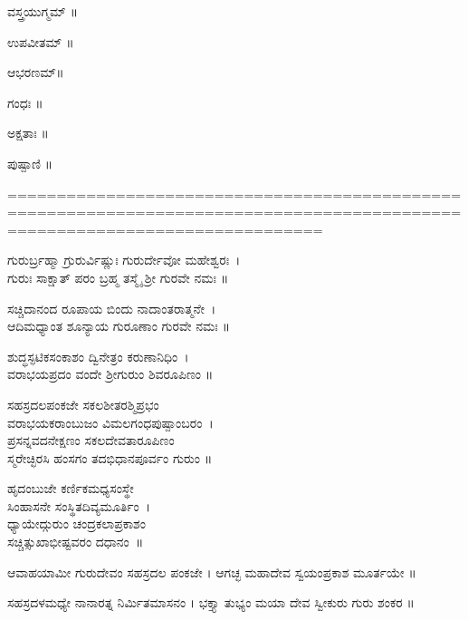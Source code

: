 ವಸ್ತ್ರಯುಗ್ಮಮ್ ॥

 ಉಪವೀತಮ್ ॥

ಆಭರಣಮ್॥

ಗಂಧಃ ॥

ಅಕ್ಷತಾಃ ॥

ಪುಷ್ಪಾಣಿ ॥


============================================================================================================================




ಗುರುರ್ಬ್ರಹ್ಮಾ ಗ್ರುರುರ್ವಿಷ್ಣುಃ ಗುರುರ್ದೇವೋ ಮಹೇಶ್ವರಃ~।\\
ಗುರುಃ ಸಾಕ್ಷಾತ್ ಪರಂ ಬ್ರಹ್ಮ ತಸ್ಮೈ ಶ್ರೀ ಗುರವೇ ನಮಃ ॥

ಸಚ್ಚಿದಾನಂದ ರೂಪಾಯ ಬಿಂದು ನಾದಾಂತರಾತ್ಮನೇ~।\\
ಆದಿಮಧ್ಯಾಂತ ಶೂನ್ಯಾಯ ಗುರೂಣಾಂ ಗುರವೇ ನಮಃ ॥

ಶುದ್ಧಸ್ಫಟಿಕಸಂಕಾಶಂ ದ್ವಿನೇತ್ರಂ ಕರುಣಾನಿಧಿಂ~।\\
ವರಾಭಯಪ್ರದಂ ವಂದೇ ಶ್ರೀಗುರುಂ ಶಿವರೂಪಿಣಂ ॥

ಸಹಸ್ರದಲಪಂಕಜೇ ಸಕಲಶೀತರಶ್ಮಿಪ್ರಭಂ\\
ವರಾಭಯಕರಾಂಬುಜಂ ವಿಮಲಗಂಧಪುಷ್ಪಾಂಬರಂ~।\\
ಪ್ರಸನ್ನವದನೇಕ್ಷಣಂ ಸಕಲದೇವತಾರೂಪಿಣಂ\\
ಸ್ಮರೇಚ್ಛಿರಸಿ ಹಂಸಗಂ ತದಭಿಧಾನಪೂರ್ವಂ ಗುರುಂ ॥


ಹೃದಂಬುಜೇ ಕರ್ಣಿಕಮಧ್ಯಸಂಸ್ಥೇ\\ ಸಿಂಹಾಸನೇ ಸಂಸ್ಥಿತದಿವ್ಯಮೂರ್ತಿಂ~।\\
ಧ್ಯಾಯೇದ್ಗುರುಂ ಚಂದ್ರಕಲಾಪ್ರಕಾಶಂ\\ ಸಚ್ಚಿತ್ಸುಖಾಭೀಷ್ಟವರಂ ದಧಾನಂ~॥

ಆವಾಹಯಾಮೀ ಗುರುದೇವಂ ಸಹಸ್ರದಲ ಪಂಕಜೇ ।
ಆಗಚ್ಛ ಮಹಾದೇವ ಸ್ವಯಂಪ್ರಕಾಶ ಮೂರ್ತಯೇ ॥

ಸಹಸ್ರದಳಮಧ್ಯೇ ನಾನಾರತ್ನ ನಿರ್ಮಿತಮಾಸನಂ ।
ಭಕ್ತ್ಯಾ ತುಭ್ಯಂ ಮಯಾ ದೇವ ಸ್ವೀಕುರು ಗುರು ಶಂಕರ ॥

